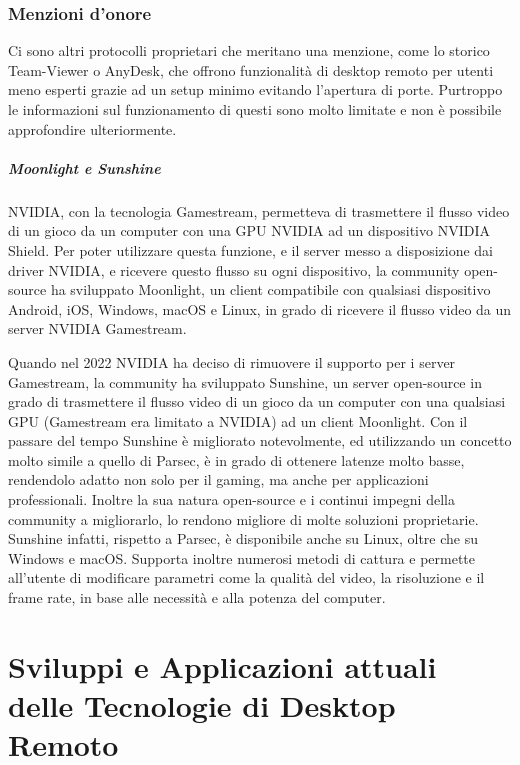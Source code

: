 \documentclass[12pt,a4paper,openright,twoside]{book}
\begin{document}
\subsection{Menzioni d'onore}
Ci sono altri protocolli proprietari che meritano una menzione, come lo storico Team-Viewer o AnyDesk, che offrono funzionalità di desktop remoto per utenti meno esperti grazie ad un setup minimo evitando l'apertura di porte. Purtroppo le informazioni sul funzionamento di questi sono molto limitate e non è possibile approfondire ulteriormente.

\paragraph{Moonlight e Sunshine}
NVIDIA, con la tecnologia Gamestream, permetteva di trasmettere il flusso video di un gioco da un computer con una GPU NVIDIA ad un dispositivo NVIDIA Shield. Per poter utilizzare questa funzione, e il server messo a disposizione dai driver NVIDIA, e ricevere questo flusso su ogni dispositivo, la community open-source ha sviluppato Moonlight, un client compatibile con qualsiasi dispositivo Android, iOS, Windows, macOS e Linux, in grado di ricevere il flusso video da un server NVIDIA Gamestream.

Quando nel 2022 NVIDIA ha deciso di rimuovere il supporto per i server Gamestream, la community ha sviluppato Sunshine, un server open-source in grado di trasmettere il flusso video di un gioco da un computer con una qualsiasi GPU (Gamestream era limitato a NVIDIA) ad un client Moonlight.
Con il passare del tempo Sunshine è migliorato notevolmente, ed utilizzando un concetto molto simile a quello di Parsec, è in grado di ottenere latenze molto basse, rendendolo adatto non solo per il gaming, ma anche per applicazioni professionali. Inoltre la sua natura open-source e i continui impegni della community a migliorarlo, lo rendono migliore di molte soluzioni proprietarie. Sunshine infatti, rispetto a Parsec, è disponibile anche su Linux, oltre che su Windows e macOS. Supporta inoltre numerosi metodi di cattura e permette all'utente di modificare parametri come la qualità del video, la risoluzione e il frame rate, in base alle necessità e alla potenza del computer.


\chapter{Sviluppi e Applicazioni attuali delle Tecnologie di Desktop Remoto}
\end{document}
